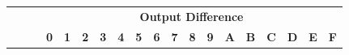 \documentclass[letterpaper,12pt]{article}
\begin{document}
\begin{table}[h]
    \centering
    \begin{tabular}{|cc|cccccccccccccccc|} 
    \cline{3-18}
    \multicolumn{1}{c}{~}                                                                                                                                                                                                                                   & ~          & \multicolumn{16}{c|}{\textbf{Output Difference}}                                                                                                                                                                                                                                                                                                                                                                                                                                                                                                                                                                                                                                                                                                                                                       \\
    \multicolumn{1}{c}{~}                                                                                                                                                                                                                                   & ~          & \textbf{0}                             & \textbf{1}                                     & \textbf{2}                                     & \textbf{3}                                     & \textbf{4}                                     & \textbf{5}                                     & \textbf{6}                                     & \textbf{7}                                     & \textbf{8}                                     & \textbf{9}                                     & \textbf{A}                                     & \textbf{B}                                     & \textbf{C}                                     & \textbf{D}                                     & \textbf{E}                                     & \textbf{F}                                      \\ 
    \hline

\end{tabular}
\end{table}
\end{document}
